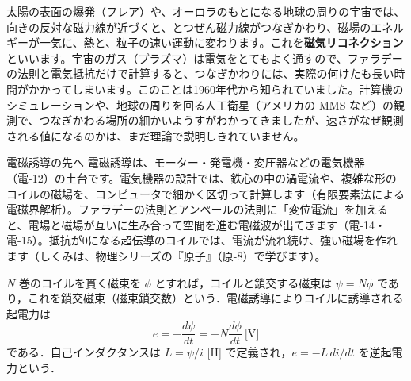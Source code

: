\begin{phmada}
太陽の表面の爆発（フレア）や、オーロラのもとになる地球の周りの宇宙では、向きの反対な磁力線が近づくと、とつぜん磁力線がつなぎかわり、磁場のエネルギーが一気に、熱と、粒子の速い運動に変わります。これを\textbf{磁気リコネクション}といいます。宇宙のガス（プラズマ）は電気をとてもよく通すので、ファラデーの法則と電気抵抗だけで計算すると、つなぎかわりには、実際の何けたも長い時間がかかってしまいます。このことは1960年代から知られていました。計算機のシミュレーションや、地球の周りを回る人工衛星（アメリカの MMS など）の観測で、つなぎかわる場所の細かいようすがわかってきましたが、速さがなぜ観測される値になるのかは、まだ理論で説明しきれていません。
\end{phmada}

\begin{phsaki}{電磁誘導の先へ}
電磁誘導は、モーター・発電機・変圧器などの電気機器（電-12）の土台です。電気機器の設計では、鉄心の中の渦電流や、複雑な形のコイルの磁場を、コンピュータで細かく区切って計算します（有限要素法による電磁界解析）。ファラデーの法則とアンペールの法則に「変位電流」を加えると、電場と磁場が互いに生み合って空間を進む電磁波が出てきます（電-14・電-15）。抵抗が0になる超伝導のコイルでは、電流が流れ続け、強い磁場を作れます（しくみは、物理シリーズの『原子』（原-8）で学びます）。
\end{phsaki}

\begin{senmonsho}
\begin{bkhonbun}
$N$ 巻のコイルを貫く磁束を $\phi$ とすれば，コイルと鎖交する磁束は $\psi=N\phi$ であり，これを鎖交磁束（磁束鎖交数）という．電磁誘導によりコイルに誘導される起電力は
\[ e=-\frac{d\psi}{dt}=-N\frac{d\phi}{dt}\ \text{[V]} \]
である．自己インダクタンスは $L=\psi/i$ [H] で定義され，$e=-L\,di/dt$ を逆起電力という．
\end{bkhonbun}
\end{senmonsho}

